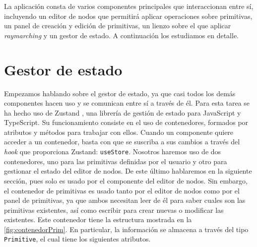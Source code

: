 La aplicación consta de varios componentes principales que interaccionan entre sí, incluyendo un editor de nodos que permitirá aplicar operaciones sobre primitivas, un panel de creación y edición de primitivas, un lienzo sobre el que aplicar \textit{raymarching} y un gestor de estado. A continuación los estudiamos en detalle.

\section{Gestor de estado}
Empezamos hablando sobre el gestor de estado, ya que casi todos los demás componentes hacen uso y se comunican entre sí a través de él. Para esta tarea se ha hecho uso de Zustand \cite{zustand}, una librería de gestión de estado para JavaScript y TypeScript. Su funcionamiento consiste en el uso de contenedores, formados por atributos y métodos para trabajar con ellos. Cuando un componente quiere acceder a un contenedor, basta con que se suscriba a sus cambios a través del \textit{hook} que proporciona Zustand: \texttt{useStore}. Nosotros haremos uso de dos contenedores, uno para las primitivas definidas por el usuario y otro para gestionar el estado del editor de nodos. De este último hablaremos en la siguiente sección, pues solo es usado por el componente del editor de nodos. Sin embargo, el contenedor de primitivas es usado tanto por el editor de nodos como por el panel de primitivas, ya que ambos necesitan leer de él para saber cuales son las primitivas existentes, así como escribir para crear nuevas o modificar las existentes. Este contenedor tiene la estructura mostrada en la \autoref{fig:contenedorPrim}. En particular, la información se almacena a través del tipo \texttt{Primitive}, el cual tiene los siguientes atributos.
